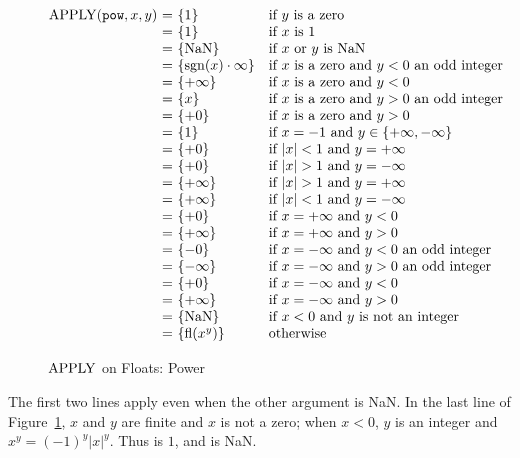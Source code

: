 \begin{figure}[htbp]
\centering
\small
\[
\begin{array}{@{}r@{\ }c@{\ }l@{\quad}l@{}}
\APPLY(\kw{pow},x,y) & = & \{1\} & \text{if}\ y\ \text{is a zero}\\
  & = & \{1\} & \text{if}\ x\ \text{is}\ 1\\
  & = & \{\dbNaN\} & \text{if}\ x\ \text{or}\ y\ \text{is}\ \dbNaN\\
  & = & \{\dbsgn(x)\cdot\infty\} & \text{if}\ x\ \text{is a zero and}\ y<0\ \text{an odd integer}\\
  & = & \{+\infty\} & \text{if}\ x\ \text{is a zero and}\ y<0\\
  & = & \{x\} & \text{if}\ x\ \text{is a zero and}\ y>0\ \text{an odd integer}\\
  & = & \{+0\} & \text{if}\ x\ \text{is a zero and}\ y>0\\
  & = & \{1\} & \text{if}\ x=-1\ \text{and}\ y\in\{+\infty,-\infty\}\\
  & = & \{+0\} & \text{if}\ |x|<1\ \text{and}\ y=+\infty\\
  & = & \{+0\} & \text{if}\ |x|>1\ \text{and}\ y=-\infty\\
  & = & \{+\infty\} & \text{if}\ |x|>1\ \text{and}\ y=+\infty\\
  & = & \{+\infty\} & \text{if}\ |x|<1\ \text{and}\ y=-\infty\\
  & = & \{+0\} & \text{if}\ x=+\infty\ \text{and}\ y<0\\
  & = & \{+\infty\} & \text{if}\ x=+\infty\ \text{and}\ y>0\\
  & = & \{-0\} & \text{if}\ x=-\infty\ \text{and}\ y<0\ \text{an odd integer}\\
  & = & \{-\infty\} & \text{if}\ x=-\infty\ \text{and}\ y>0\ \text{an odd integer}\\
  & = & \{+0\} & \text{if}\ x=-\infty\ \text{and}\ y<0\\
  & = & \{+\infty\} & \text{if}\ x=-\infty\ \text{and}\ y>0\\
  & = & \{\dbNaN\} & \text{if}\ x<0\ \text{and}\ y\ \text{is not an integer}\\
  & = & \{\dbfl(x^{y})\} & \text{otherwise}
\end{array}
\]
\caption{$\mathrm{APPLY}$ on Floats: Power}\label{fig:dynamic-basis-pow}
\end{figure}

The first two lines apply even when the other argument is NaN. In the last
line of Figure~\ref{fig:dynamic-basis-pow}, $x$ and $y$ are finite
and $x$ is not a zero; when $x<0$, $y$ is an integer and
$x^{y}=(-1)^{y}|x|^{y}$. Thus  is $1$, and
 is NaN. %

